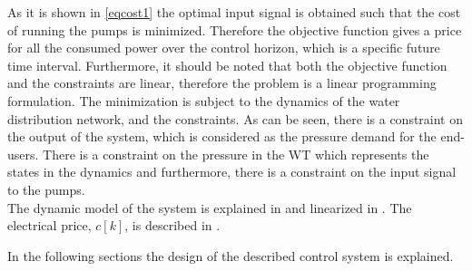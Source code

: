 As it is shown in \eqref{eqcost1} the optimal input signal is obtained such that the cost of running the pumps is minimized. Therefore the objective function gives a price for all the consumed power over the control horizon, which is a specific future time interval. Furthermore, it should be noted that both the objective function and the constraints are linear, therefore the problem is a linear programming formulation. The minimization is subject to the dynamics of the water distribution network, and the constraints. As can be seen, there is a constraint on the output of the system, which is considered as the pressure demand for the end-users. There is a constraint on the pressure in the WT which represents the states in the dynamics and furthermore, there is a constraint on the input signal to the pumps. 
\\
The dynamic model of the system is explained in  and linearized in . The electrical price, $c[k]$, is described in . %

In the following sections the design of the described control system is explained. 







